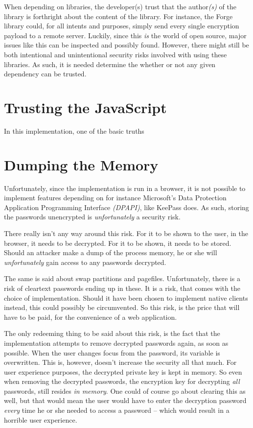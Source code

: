 		When depending on libraries, the developer(s) trust that the author\emph{(s)} of the library is forthright about the content of the library. For instance, the Forge library could, for all intents and purposes, simply send every single encryption payload to a remote server. Luckily, since this \emph{is} the world of open source, major issues like this can be inspected and possibly found. However, there might still be both intentional and unintentional security risks involved with using these libraries. As such, it is needed determine the whether or not any given dependency can be trusted.

	\section{Trusting the JavaScript}
		In this implementation, one of the basic truths 


	\section{Dumping the Memory}
		Unfortunately, since the implementation is run in a browser, it is not possible to implement features depending on for instance Microsoft's Data Protection Application Programming Interface \emph{(DPAPI)}, like KeePass does. As such, storing the passwords unencrypted is \emph{unfortunately} a security risk.

		There really isn't any way around this risk. For it to be shown to the user, in the browser, it needs to be decrypted. For it to be shown, it needs to be stored. Should an attacker make a dump of the process memory, he or she will \emph{unfortunately} gain access to any passwords decrypted. 

		The same is said about swap partitions and pagefiles. Unfortunately, there is a risk of cleartext passwords ending up in these. It is a risk, that comes with the choice of implementation. Should it have been chosen to implement native clients instead, this could possibly be circumvented. So this risk, is the price that will have to be paid, for the convenience of a web application.

		The only redeeming thing to be said about this risk, is the fact that the implementation attempts to remove decrypted passwords again, as soon as possible. When the user changes focus from the password, its variable is overwritten. This is, however, doesn't increase the security all that much. For user experience purposes, the decrypted private key is kept in memory. So even when removing the decrypted passwords, the encryption key for decrypting \emph{all} passwords, still resides \emph{in memory}. One could of course go about clearing this as well, but that would mean the user would have to enter the decryption password \emph{every} time he or she needed to access a password -- which would result in a horrible user experience.





	